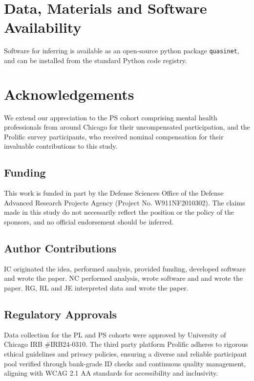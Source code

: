 \documentclass[onecolumn,10pt]{IEEEtran}
\begin{document}



  

\section*{Data, Materials and Software Availability}
Software for inferring  is available as an open-source python package \texttt{quasinet}, and can be
installed from the standard Python code registry.

 
\section*{Acknowledgements}
We extend our appreciation to the PS cohort comprising mental health professionals from around Chicago for their uncompensated participation, and the Prolific survey participants, who received nominal compensation for their invaluable contributions to this study.

\subsection*{Funding}
 This work is funded in part by the Defense Sciences Office of the Defense Advanced Research Projects Agency (Project No. W911NF2010302). The claims made in this study  do not necessarily reflect the position or the
policy of the sponsors, and no official endorsement should be inferred.

\subsection*{Author Contributions}
IC originated  the idea, performed analysis, provided funding, developed software and wrote the paper. NC performed analysis, wrote software and and wrote the paper. RG, RL and JE interpreted data and wrote the paper. 

\subsection*{Regulatory Approvals}
Data collection for the PL and PS cohorts were approved by University of Chicago IRB \#IRB24-0310. The third party platform  Prolific  adheres to rigorous ethical guidelines and privacy policies, ensuring a diverse and reliable participant pool verified through bank-grade ID checks and continuous quality management, aligning with WCAG 2.1 AA standards for accessibility and inclusivity.
\end{document}
